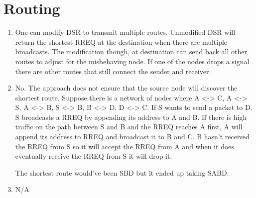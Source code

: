 \documentclass[11pt]{article}
\begin{document}
\section{Routing}
\begin{enumerate}[label=(\alph*)]
\item {
	One can modify DSR to transmit multiple routes. Unmodified DSR will return the shortest RREQ at the destination when there are multiple broadcasts. The 
	modification though, at destination can send back all other routes to adjust for the misbehaving node. If one of the nodes drops a signal there are other routes 
	that still connect the sender and receiver. 
}
\item {
	No. The approach does not ensure that the source node will discover the shortest route. Suppose there is a network of nodes where A <-> C, A <-> S, A <-> B, 
	S <-> B, B <-> D, D <-> C. If S wants to send a packet to D. S broadcasts a RREQ by appending its address to A and B. If there is high traffic on the path 
	between S and B and the RREQ reaches A first, A will append its address to RREQ and broadcast it to B and C. B hasn't received the RREQ from S so it will
	accept the RREQ from A and when it does eventually receive the RREQ from S it will drop it.
	
	The shortest route would've been SBD but it ended up taking SABD.
}
\item {
	N/A
}
\end{enumerate}
\end{document}
